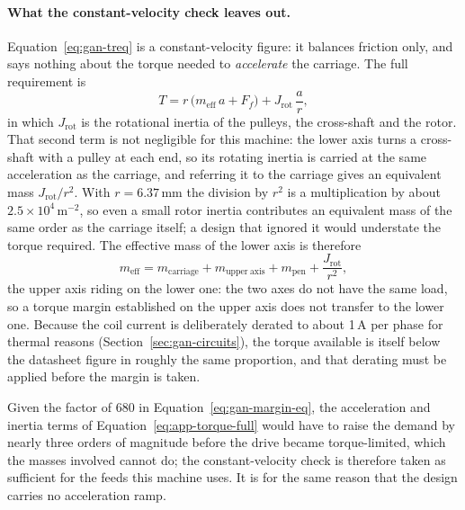 \paragraph{What the constant-velocity check leaves out.}
Equation~\ref{eq:gan-treq} is a constant-velocity figure: it balances friction only, and says nothing about the torque needed to \emph{accelerate} the carriage. The full requirement is
\begin{equation}
T=r\,\bigl(m_{\mathrm{eff}}\,a+F_f\bigr)+J_{\mathrm{rot}}\,\frac{a}{r},
\label{eq:app-torque-full}
\end{equation}
in which $J_{\mathrm{rot}}$ is the rotational inertia of the pulleys, the cross-shaft and the rotor. That second term is not negligible for this machine: the lower axis turns a cross-shaft with a pulley at each end, so its rotating inertia is carried at the same acceleration as the carriage, and referring it to the carriage gives an equivalent mass $J_{\mathrm{rot}}/r^2$. With $r=6.37$\,mm the division by $r^2$ is a multiplication by about $2.5\times10^{4}$\,m$^{-2}$, so even a small rotor inertia contributes an equivalent mass of the same order as the carriage itself; a design that ignored it would understate the torque required. The effective mass of the lower axis is therefore
\begin{equation}
m_{\mathrm{eff}}=m_{\mathrm{carriage}}+m_{\mathrm{upper\ axis}}+m_{\mathrm{pen}}+\frac{J_{\mathrm{rot}}}{r^{2}},
\label{eq:app-meff}
\end{equation}
the upper axis riding on the lower one: the two axes do not have the same load, so a torque margin established on the upper axis does not transfer to the lower one. Because the coil current is deliberately derated to about 1\,A per phase for thermal reasons (Section~\ref{sec:gan-circuits}), the torque available is itself below the datasheet figure in roughly the same proportion, and that derating must be applied before the margin is taken.

Given the factor of 680 in Equation~\ref{eq:gan-margin-eq}, the acceleration and inertia terms of Equation~\ref{eq:app-torque-full} would have to raise the demand by nearly three orders of magnitude before the drive became torque-limited, which the masses involved cannot do; the constant-velocity check is therefore taken as sufficient for the feeds this machine uses. It is for the same reason that the design carries no acceleration ramp.

